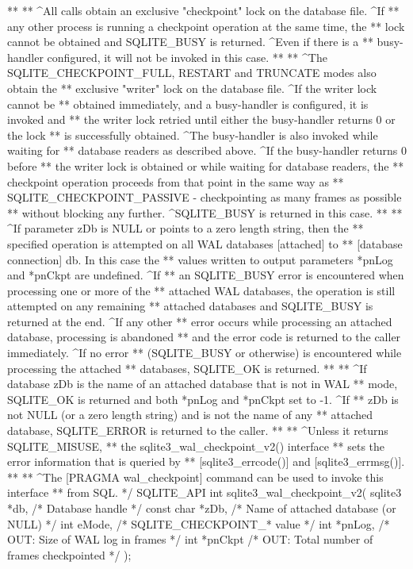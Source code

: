 \begin{Codex}[label=sqlite3.h,numbers=left]
{**
** ^All calls obtain an exclusive "checkpoint" lock on the database file. ^If
** any other process is running a checkpoint operation at the same time, the 
** lock cannot be obtained and SQLITE_BUSY is returned. ^Even if there is a 
** busy-handler configured, it will not be invoked in this case.
**
** ^The SQLITE_CHECKPOINT_FULL, RESTART and TRUNCATE modes also obtain the 
** exclusive "writer" lock on the database file. ^If the writer lock cannot be
** obtained immediately, and a busy-handler is configured, it is invoked and
** the writer lock retried until either the busy-handler returns 0 or the lock
** is successfully obtained. ^The busy-handler is also invoked while waiting for
** database readers as described above. ^If the busy-handler returns 0 before
** the writer lock is obtained or while waiting for database readers, the
** checkpoint operation proceeds from that point in the same way as 
** SQLITE_CHECKPOINT_PASSIVE - checkpointing as many frames as possible 
** without blocking any further. ^SQLITE_BUSY is returned in this case.
**
** ^If parameter zDb is NULL or points to a zero length string, then the
** specified operation is attempted on all WAL databases [attached] to 
** [database connection] db.  In this case the
** values written to output parameters *pnLog and *pnCkpt are undefined. ^If 
** an SQLITE_BUSY error is encountered when processing one or more of the 
** attached WAL databases, the operation is still attempted on any remaining 
** attached databases and SQLITE_BUSY is returned at the end. ^If any other 
** error occurs while processing an attached database, processing is abandoned 
** and the error code is returned to the caller immediately. ^If no error 
** (SQLITE_BUSY or otherwise) is encountered while processing the attached 
** databases, SQLITE_OK is returned.
**
** ^If database zDb is the name of an attached database that is not in WAL
** mode, SQLITE_OK is returned and both *pnLog and *pnCkpt set to -1. ^If
** zDb is not NULL (or a zero length string) and is not the name of any
** attached database, SQLITE_ERROR is returned to the caller.
**
** ^Unless it returns SQLITE_MISUSE,
** the sqlite3_wal_checkpoint_v2() interface
** sets the error information that is queried by
** [sqlite3_errcode()] and [sqlite3_errmsg()].
**
** ^The [PRAGMA wal_checkpoint] command can be used to invoke this interface
** from SQL.
*/
SQLITE_API int sqlite3_wal_checkpoint_v2(
  sqlite3 *db,                    /* Database handle */
  const char *zDb,                /* Name of attached database (or NULL) */
  int eMode,                      /* SQLITE_CHECKPOINT_* value */
  int *pnLog,                     /* OUT: Size of WAL log in frames */
  int *pnCkpt                     /* OUT: Total number of frames checkpointed */
);

}
\end{Codex}
